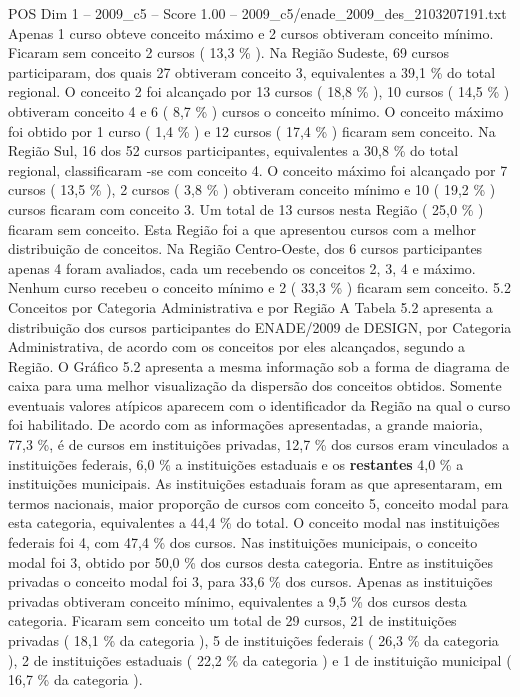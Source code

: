 \begin{textsample}{POS Dim 1 – 2009\_c5 – Score 1.00 – 2009\_c5/enade\_2009\_des\_2103207191.txt}
Apenas 1 curso obteve conceito máximo e 2 cursos obtiveram conceito mínimo.
Ficaram sem conceito 2 cursos ( 13,3 \% ).
Na Região Sudeste, 69 cursos participaram, dos quais 27 obtiveram conceito 3, equivalentes a 39,1 \% do total regional.
O conceito 2 foi alcançado por 13 cursos ( 18,8 \% ), 10 cursos ( 14,5 \% ) obtiveram conceito 4 e 6 ( 8,7 \% ) cursos o conceito mínimo.
O conceito máximo foi obtido por 1 curso ( 1,4 \% ) e 12 cursos ( 17,4 \% ) ficaram sem conceito.
Na Região Sul, 16 dos 52 cursos participantes, equivalentes a 30,8 \% do total regional, classificaram -se com conceito 4.
O conceito máximo foi alcançado por 7 cursos ( 13,5 \% ), 2 cursos ( 3,8 \% ) obtiveram conceito mínimo e 10 ( 19,2 \% ) cursos ficaram com conceito 3.
Um total de 13 cursos nesta Região ( 25,0 \% ) ficaram sem conceito.
Esta Região foi a que apresentou cursos com a melhor distribuição de conceitos.
Na Região Centro-Oeste, dos 6 cursos participantes apenas 4 foram avaliados, cada um recebendo os conceitos 2, 3, 4 e máximo.
Nenhum curso recebeu o conceito mínimo e 2 ( 33,3 \% ) ficaram sem conceito. 5.2 Conceitos por Categoria Administrativa e por Região A Tabela 5.2 apresenta a distribuição dos cursos participantes do ENADE/2009 de DESIGN, por Categoria Administrativa, de acordo com os conceitos por eles alcançados, segundo a Região.
O Gráfico 5.2 apresenta a mesma informação sob a forma de diagrama de caixa para uma melhor visualização da dispersão dos conceitos obtidos.
Somente eventuais valores atípicos aparecem com o identificador da Região na qual o curso foi habilitado.
De acordo com as informações apresentadas, a grande maioria, 77,3 \%, é de cursos em instituições privadas, 12,7 \% dos cursos eram vinculados a instituições federais, 6,0 \% a instituições estaduais e os \textbf{restantes} 4,0 \% a instituições municipais.
As instituições estaduais foram as que apresentaram, em termos nacionais, maior proporção de cursos com conceito 5, conceito modal para esta categoria, equivalentes a 44,4 \% do total.
O conceito modal nas instituições federais foi 4, com 47,4 \% dos cursos.
Nas instituições municipais, o conceito modal foi 3, obtido por 50,0 \% dos cursos desta categoria.
Entre as instituições privadas o conceito modal foi 3, para 33,6 \% dos cursos.
Apenas as instituições privadas obtiveram conceito mínimo, equivalentes a 9,5 \% dos cursos desta categoria.
Ficaram sem conceito um total de 29 cursos, 21 de instituições privadas ( 18,1 \% da categoria ), 5 de instituições federais ( 26,3 \% da categoria ), 2 de instituições estaduais ( 22,2 \% da categoria ) e 1 de instituição municipal ( 16,7 \% da categoria ).

\end{textsample}
